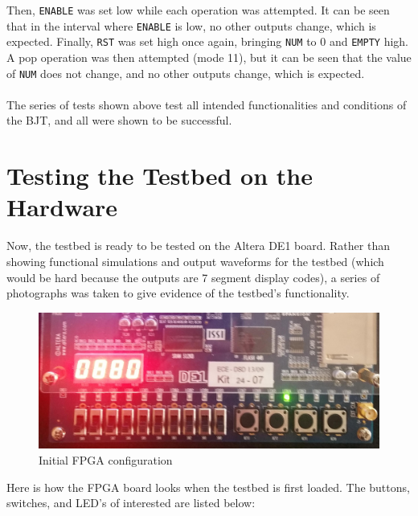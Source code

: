 \documentclass[12pt]{report}
\begin{document}
Then, \texttt{ENABLE} was set low while each operation was attempted. It can be seen that in the
interval where \texttt{ENABLE} is low, no other outputs change, which is expected. Finally,
\texttt{RST} was set high once again, bringing \texttt{NUM} to 0 and \texttt{EMPTY} high. A pop
operation was then attempted (mode 11), but it can be seen that the value of \texttt{NUM} does not
change, and no other outputs change, which is expected.\\\\
The series of tests shown above test all intended functionalities and conditions of the BJT, and all
were shown to be successful.
\chapter*{Testing the Testbed on the Hardware}
Now, the testbed is ready to be tested on the Altera DE1 board. Rather than showing functional
simulations and output waveforms for the testbed (which would be hard because the outputs are 7
segment display codes), a series of photographs was taken to give evidence of the testbed's
functionality.
\begin{figure}[h]
	\begin{center}
		\caption{Initial FPGA configuration}
		\includegraphics[scale=0.15]{fpga1}
	\end{center}
\end{figure}
Here is how the FPGA board looks when the testbed is first loaded. The buttons, switches, and LED's
of interested are listed below:
\end{document}
